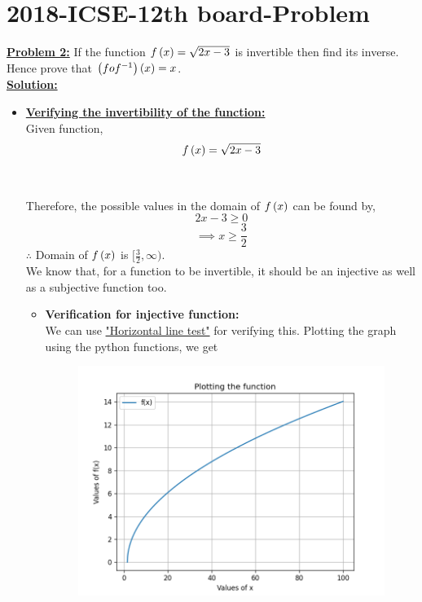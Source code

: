 \documentclass[journal,12pt,twocolumn]{IEEEtran}
\begin{document}
	\section{2018-ICSE-12th board-Problem}
\textbf{\underline{Problem 2:}} If the function $f\left(x\right)=\sqrt{2x-3}$ is invertible then find its inverse. Hence prove that $\left(fof^{-1}\right)\left(x\right)=x$.\\
	\textbf{\underline{Solution:} }
	\begin{itemize}
	\item
	\textbf{\underline{Verifying the invertibility of the function:}}\\
	Given function,
	\begin{equation} \label{eq:1.0}
	f\left(x\right) = \sqrt{2x-3}
	\end{equation}
	\begin{center}
\\
\end{center}
	Therefore, the possible values in the domain of $f\left(x\right)$ can be found by,
	\begin{equation}
	2x - 3 \geq 0
	\end{equation}
	\begin{equation}
	\implies x \geq \frac{3}{2}
	\end{equation}
	$\therefore$ Domain of $f\left(x\right)$ is $[\frac{3}{2},\infty)$.\\
	We know that, for a function to be invertible, it should be an injective as well as a subjective function too.
	\begin{itemize}
	\item
	\textbf{Verification for injective function:}\\
	We can use \underline{"Horizontal line test"} for verifying this. Plotting the graph using the python functions, we get
	\begin{figure}[htb]
		\centering
		\includegraphics[width=\columnwidth]{Fig_1.png}

\end{figure}
\end{itemize}
\end{itemize}
\end{document}
